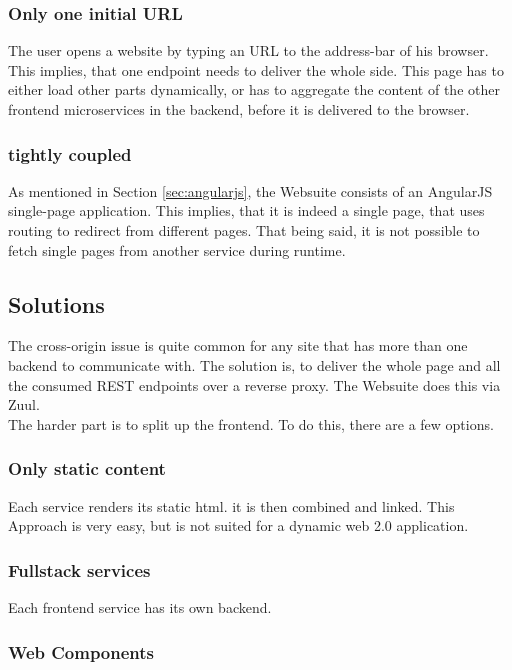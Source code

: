 \subsubsection{Only one initial URL}
The user opens a website by typing an URL to the address-bar of his browser. This implies, that one endpoint needs to deliver the whole side. This page has to either load other parts dynamically, or has to aggregate the content of the other frontend microservices in the backend, before it is delivered to the browser.

\subsubsection{tightly coupled}
As mentioned in Section \ref{sec:angularjs}, the Websuite consists of an AngularJS single-page application. This implies, that it is indeed a single page, that uses routing to redirect from different pages. That being said, it is not possible to fetch single pages from another service during runtime.

\subsection{Solutions}
The cross-origin issue is quite common for any site that has more than one backend to communicate with. The solution is, to deliver the whole page and all the consumed REST endpoints over a reverse proxy. The Websuite does this via Zuul.\\
The harder part is to split up the frontend. To do this, there are a few options.

\subsubsection{Only static content}
Each service renders its static html. it is then combined and linked. This Approach is very easy, but is not suited for a dynamic web 2.0 application.

\subsubsection{Fullstack services}
Each frontend service has its own backend.

\subsubsection{Web Components}



